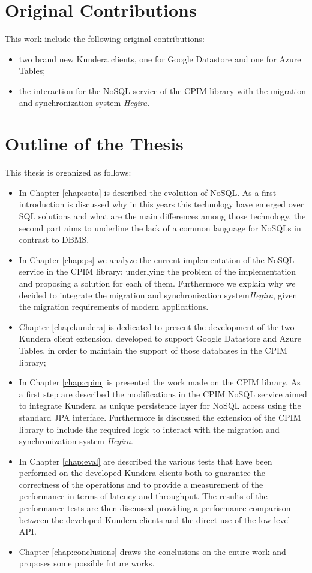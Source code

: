 \section*{Original Contributions}
This work include the following original contributions:
\begin{itemize}
\item two brand new Kundera clients, one for Google Datastore and one for Azure Tables;
\item the interaction for the NoSQL service of the CPIM library with the migration and synchronization system \textit{Hegira}.
\end{itemize}

\section*{Outline of the Thesis}
This thesis is organized as follows: 
\begin{itemize}
\item In Chapter \ref{chap:sota} is described the evolution of NoSQL. As a first introduction is discussed why in this years this technology have emerged over SQL solutions and what are the main differences among those technology, the second part aims to underline the lack of a common language for NoSQLs in contrast to DBMS.
\item In Chapter \ref{chap:ps} we analyze the current implementation of the NoSQL service in the CPIM library; underlying the problem of the implementation and proposing a solution for each of them. Furthermore we explain why we decided to integrate the migration and synchronization system\textit{Hegira}, given the migration requirements of modern applications.
\item Chapter \ref{chap:kundera} is dedicated to present the development of the two Kundera client extension, developed to support Google Datastore and Azure Tables, in order to maintain the support of those databases in the CPIM library;
\item In Chapter \ref{chap:cpim} is presented the work made on the CPIM library. As a first step are described the modifications in the CPIM NoSQL service aimed to integrate Kundera as unique persistence layer for NoSQL access using the standard JPA interface. Furthermore is discussed the extension of the CPIM library to include the required logic to interact with the migration and synchronization system \textit{Hegira}.
\item In Chapter \ref{chap:eval} are described the various tests that have been performed on the developed Kundera clients both to guarantee the correctness of the operations and to provide a measurement of the performance in terms of latency and throughput. The results of the performance tests are then discussed providing a performance comparison between the developed Kundera clients and the direct use of the low level API.
\item Chapter \ref{chap:conclusions} draws the conclusions on the entire work and proposes some possible future works.
\end{itemize}

